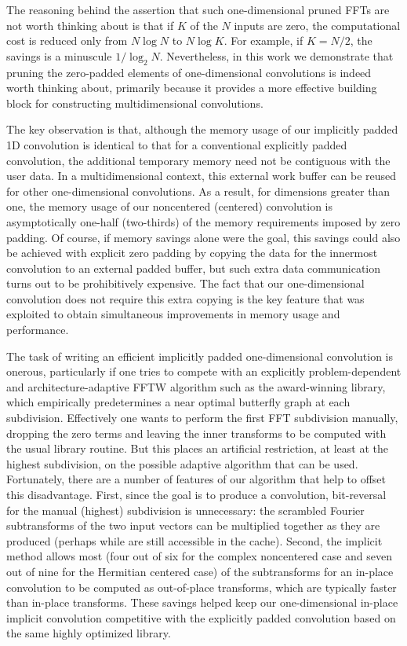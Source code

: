 \documentclass[final]{siamltex}
\begin{document}
The reasoning behind the assertion that such one-dimensional pruned FFTs
are not worth thinking about is that if $K$ of the $N$ inputs are zero,
the computational cost is reduced only from $N\log N$ to $N\log K$.
For example, if $K=N/2$, the savings is a minuscule $1/\log_2 N$.
Nevertheless, in this work we demonstrate that pruning the zero-padded
elements of one-dimensional convolutions is indeed worth thinking about,
primarily because it provides a more effective building block for constructing
multidimensional convolutions.

The key observation is that, although the memory usage of our implicitly
padded 1D convolution is identical to that for a conventional explicitly
padded convolution, the additional temporary memory need not be contiguous
with the user data.  In a multidimensional context, this external work
buffer can be reused for other one-dimensional convolutions.
As a result, for dimensions greater than one, the memory usage of our
noncentered (centered) convolution is asymptotically one-half (two-thirds)
of the memory requirements imposed by zero padding.
Of course, if memory savings alone were the goal, this savings could
also be achieved with explicit zero padding by copying the data for the
innermost convolution to an external padded buffer, but such extra data
communication turns out to be prohibitively expensive. The fact that our
one-dimensional convolution does not require this extra copying is the key
feature that was exploited to obtain simultaneous improvements in memory
usage and performance.

The task of writing an efficient implicitly padded one-dimensional
convolution is onerous, particularly if one tries to compete with an
explicitly problem-dependent and architecture-adaptive FFTW algorithm such
as the award-winning \cite{FFTW} library, which empirically predetermines a
near optimal butterfly graph at each subdivision. Effectively one wants to
perform the first FFT subdivision manually, dropping the zero terms and
leaving the inner transforms to be computed with the usual library
routine. But this places an artificial restriction, at least at the highest
subdivision, on the possible adaptive algorithm that can be
used. Fortunately, there are a number of features of our algorithm that
help to offset this disadvantage. First, since the goal is to produce a
convolution, bit-reversal for the manual (highest) subdivision is
unnecessary: the scrambled Fourier subtransforms of the two input vectors
can be multiplied together as they are produced (perhaps while are still
accessible in the cache). Second, the implicit method allows most (four out
of six for the complex noncentered case and seven out of nine for the
Hermitian centered case) of the subtransforms for an in-place convolution
to be computed as out-of-place transforms, which are typically faster than
in-place transforms.  These savings helped keep our one-dimensional in-place
implicit convolution competitive with the explicitly padded convolution
based on the same highly optimized library.
\end{document}
